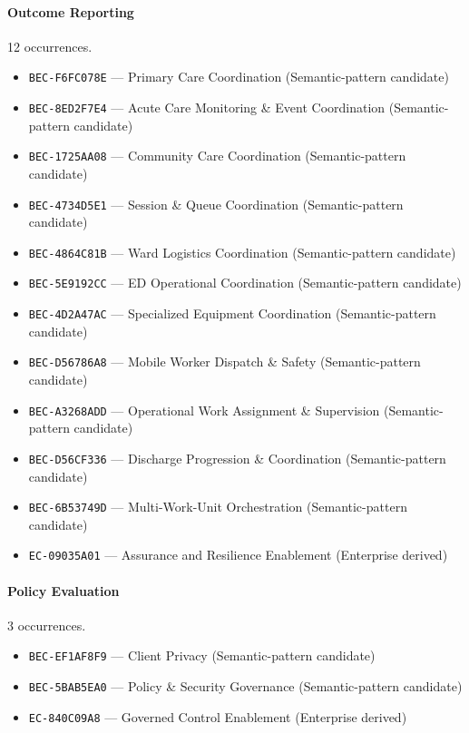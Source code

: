 \documentclass[11pt,a4paper,openany]{book}
\begin{document}
\paragraph{Outcome Reporting} 12 occurrences.\par
\begin{itemize}
\item \texttt{BEC-F6FC078E} --- Primary Care Coordination (Semantic-pattern candidate)
\item \texttt{BEC-8ED2F7E4} --- Acute Care Monitoring \& Event Coordination (Semantic-pattern candidate)
\item \texttt{BEC-1725AA08} --- Community Care Coordination (Semantic-pattern candidate)
\item \texttt{BEC-4734D5E1} --- Session \& Queue Coordination (Semantic-pattern candidate)
\item \texttt{BEC-4864C81B} --- Ward Logistics Coordination (Semantic-pattern candidate)
\item \texttt{BEC-5E9192CC} --- ED Operational Coordination (Semantic-pattern candidate)
\item \texttt{BEC-4D2A47AC} --- Specialized Equipment Coordination (Semantic-pattern candidate)
\item \texttt{BEC-D56786A8} --- Mobile Worker Dispatch \& Safety (Semantic-pattern candidate)
\item \texttt{BEC-A3268ADD} --- Operational Work Assignment \& Supervision (Semantic-pattern candidate)
\item \texttt{BEC-D56CF336} --- Discharge Progression \& Coordination (Semantic-pattern candidate)
\item \texttt{BEC-6B53749D} --- Multi-Work-Unit Orchestration (Semantic-pattern candidate)
\item \texttt{EC-09035A01} --- Assurance and Resilience Enablement (Enterprise derived)
\end{itemize}
\paragraph{Policy Evaluation} 3 occurrences.\par
\begin{itemize}
\item \texttt{BEC-EF1AF8F9} --- Client Privacy (Semantic-pattern candidate)
\item \texttt{BEC-5BAB5EA0} --- Policy \& Security Governance (Semantic-pattern candidate)
\item \texttt{EC-840C09A8} --- Governed Control Enablement (Enterprise derived)
\end{itemize}
\end{document}
